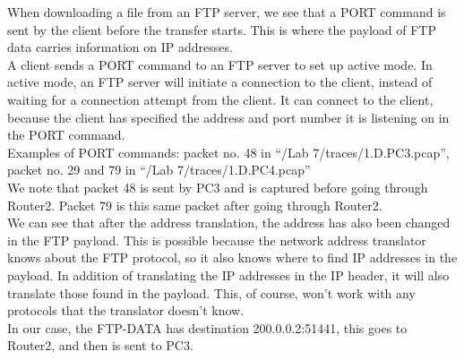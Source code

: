 When downloading a file from an FTP server, we see that a PORT command is sent by the client
before the transfer starts.
This is where the payload of FTP data carries information on IP addresses. \\ 
A client sends a PORT command to an FTP server to set up active mode. In active mode, an FTP
server will initiate a connection to the client, instead of waiting for a connection attempt
from the client. It can connect to the client, because the client has specified the address
and port number it is listening on in the PORT command. \\

Examples of PORT commands: packet no. 48 in ``/Lab 7/traces/1.D.PC3.pcap'', packet no. 29 and
79 in ``/Lab 7/traces/1.D.PC4.pcap'' \\

We note that packet 48 is sent by PC3 and is captured before going through Router2. Packet 79
is this same packet after going through Router2. \\
We can see that after the address translation, the address has also been changed in the FTP
payload. This is possible because the network address translator knows about the FTP protocol,
so it also knows where to find IP addresses in the payload. In addition of translating the
IP addresses in the IP header, it will also translate those found in the payload. This, of course,
won't work with any protocols that the translator doesn't know. \\
In our case, the FTP-DATA has destination 200.0.0.2:51441, this goes to Router2, and then is
sent to PC3.
